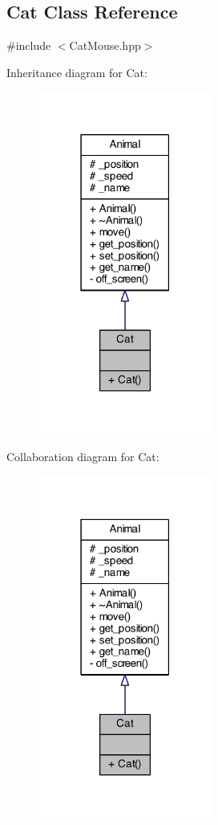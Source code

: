 \subsection{Cat Class Reference}
\label{class_cat}


{\ttfamily \#include $<$Cat\-Mouse.\-hpp$>$}



Inheritance diagram for Cat\-:
\nopagebreak
\begin{figure}[H]
\begin{center}
\leavevmode
\includegraphics[width=162pt]{class_cat__inherit__graph}
\end{center}
\end{figure}


Collaboration diagram for Cat\-:
\nopagebreak
\begin{figure}[H]
\begin{center}
\leavevmode
\includegraphics[width=162pt]{class_cat__coll__graph}
\end{center}
\end{figure}
